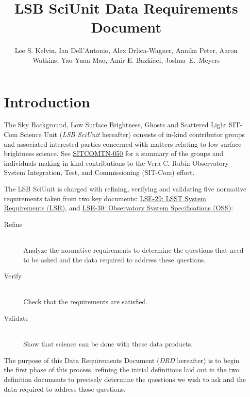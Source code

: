 \documentclass[SE,authoryear,toc]{lsstdoc}
\title{LSB SciUnit Data Requirements Document}
\author{
Lee S. Kelvin, Ian Dell'Antonio, Alex Drlica-Wagner, Annika Peter, Aaron Watkins, Yao-Yuan Mao, Amir E. Bazkiaei, Joshua~E.~Meyers
}
\date{\vcsDate}
\begin{document}
\maketitle


\section{Introduction}  \label{sec:introduction}

The Sky Background, Low Surface Brightness, Ghosts and Scattered Light SIT-Com Science Unit (\textit{LSB SciUnit} hereafter) consists of in-kind contributor groups and associated interested parties concerned with matters relating to low surface brightness science.
See \href{https://sitcomtn-050.lsst.io/}{SITCOMTN-050} for a summary of the groups and individuals making in-kind contributions to the Vera C. Rubin Observatory System Integration, Test, and Commissioning (SIT-Com) effort.

The LSB SciUnit is charged with refining, verifying and validating five normative requirements taken from two key documents: \href{https://docushare.lsst.org/docushare/dsweb/Get/LSE-29}{LSE-29: LSST System Requirements (LSR)}, and \href{https://docushare.lsst.org/docushare/dsweb/Get/LSE-30}{LSE-30: Observatory System Specifications (OSS)}:
\begin{description}
  \item[Refine] \hfill \\ Analyze the normative requirements to determine the questions that need to be asked and the data required to address these questions.
  \item[Verify] \hfill \\ Check that the requirements are satisfied.
  \item[Validate] \hfill \\ Show that science can be done with these data products.
\end{description}

The purpose of this Data Requirements Document (\textit{DRD} hereafter) is to begin the first phase of this process, refining the initial definitions laid out in the two definition documents to precisely determine the questions we wish to ask and the data required to address those questions.
\end{document}
